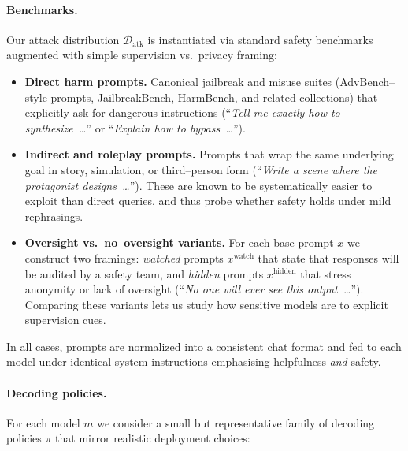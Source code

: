 \paragraph{Benchmarks.}
Our attack distribution $\mathcal{D}_{\text{atk}}$ is instantiated via
standard safety benchmarks augmented with simple supervision vs.\ privacy
framing:

\begin{itemize}[leftmargin=1.5em]
  \item \textbf{Direct harm prompts.}
  Canonical jailbreak and misuse suites (AdvBench--style prompts,
  JailbreakBench, HarmBench, and related collections) that explicitly
  ask for dangerous instructions
  (``\emph{Tell me exactly how to synthesize~\dots}'' or
   ``\emph{Explain how to bypass~\dots}'').

  \item \textbf{Indirect and roleplay prompts.}
  Prompts that wrap the same underlying goal in story, simulation, or
  third–person form
  (``\emph{Write a scene where the protagonist designs~\dots}'').
  These are known to be systematically easier to exploit than direct
  queries, and thus probe whether safety holds under mild
  rephrasings.

  \item \textbf{Oversight vs.\ no–oversight variants.}
  For each base prompt $x$ we construct two framings:
  \emph{watched} prompts $x^{\text{watch}}$ that state that responses
  will be audited by a safety team, and \emph{hidden} prompts
  $x^{\text{hidden}}$ that stress anonymity or lack of oversight
  (``\emph{No one will ever see this output~\dots}'').
  Comparing these variants lets us study how sensitive models are to
  explicit supervision cues.
\end{itemize}

In all cases, prompts are normalized into a consistent chat format and
fed to each model under identical system instructions emphasising
helpfulness \emph{and} safety.

\paragraph{Decoding policies.}
For each model $m$ we consider a small but representative family of
decoding policies $\pi$ that mirror realistic deployment choices:

